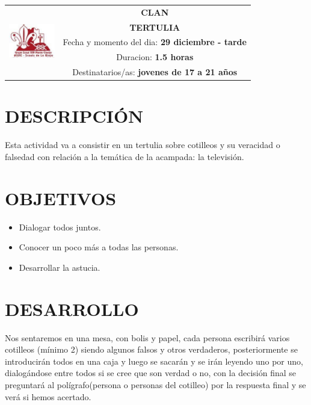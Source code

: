 \documentclass[72pt]{article}
\newlength{\w}
\begin{document}
\large
{}\selectfont
\begin{tabular}{|p{2cm}|c|}
\hline
\multirow{5}{*}{\includegraphics[width=2cm]{logo}} & \textbf{CLAN} \\ %
\cline{2-2}
& \textbf{TERTULIA} \\ %
\cline{2-2}
& \parbox{\textwidth-4cm}{Fecha y momento del dia: \textbf{29 diciembre - tarde}} \\ %
& \parbox{\textwidth-4cm}{Duracion: \textbf{1.5 horas}} \\ %
& \parbox{\textwidth-4cm}{Destinatarios/as: \textbf{jovenes de 17 a 21 años}} \\ %
\hline
\end{tabular}

\section*{DESCRIPCI\'ON} 
Esta actividad va a consistir en un tertulia sobre cotilleos y su veracidad o
falsedad con relación a la temática de la acampada: la televisión.

\section*{OBJETIVOS}
\begin{itemize}
    \item Dialogar todos juntos.
    \item Conocer un poco más a todas las personas.
    \item Desarrollar la astucia.
\end{itemize}

\section*{DESARROLLO}
Nos sentaremos en una mesa, con bolis y papel, cada persona escribirá
varios cotilleos (mínimo 2) siendo algunos falsos y otros verdaderos,
posteriormente se introducirán todos en una caja y luego se sacarán y se
irán leyendo uno por uno, dialogándose entre todos si se cree que son
verdad o no, con la decisión final se preguntará al polígrafo(persona o
personas del cotilleo) por la respuesta final y se verá si hemos acertado.
\end{document}
